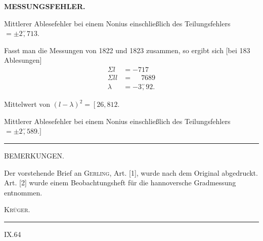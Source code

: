 \par\clearpage
\noindent\null\hfill{\small\textbf{MESSUNGSFEHLER.}}\hfill{}\par\medskip
\par\noindent\hspace*{\parindent}Mittlerer Ablesefehler bei einem Nonius einschließlich des Teilungsfehlers $=\pm2\overset{\prime\prime}{,}713$.
\par\noindent\hspace*{\parindent}Fasst man die Messungen von 1822 und 1823 zusammen, so ergibt sich [bei 183 Ablesungen]
\[
\begin{aligned}
\Sigma l&=-717\\
\Sigma ll&=\phantom{-}7689\\
\lambda&=-3\overset{\prime\prime}{,}92.
\end{aligned}
\]
\par\noindent\hspace*{\parindent}Mittelwert von $(l-\lambda)^2=\left[26{,}812.\right.$
\par\noindent\hspace*{\parindent}Mittlerer Ablesefehler bei einem Nonius einschließlich des Teilungsfehlers $=\pm2\overset{\prime\prime}{,}589.]$
\par\bigskip\bigskip
\begin{center}\rule{2.6cm}{.4pt}\end{center}
\vspace{1.5cm}
{\small
\begin{center}BEMERKUNGEN.\end{center}
\par\noindent\hspace*{\parindent}Der vorstehende Brief an \textsc{Gerling}, Art. [1], wurde nach dem Original abgedruckt. Art. [2] wurde einem Beobachtungsheft für die hannoversche Gradmessung entnommen.
\par\noindent\hfill\textsc{Krüger.}\hspace*{1em}\par}
\vspace{2cm}
\begin{center}\rule{3.5cm}{.4pt}\end{center}

\vfill
\noindent IX.\hfill 64\hspace*{1cm}\par

\par\clearpage
\null

